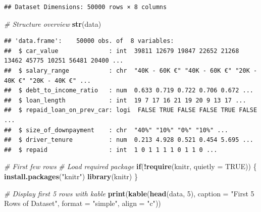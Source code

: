 \documentclass[
]{article}
\newenvironment{Shaded}{\begin{snugshade}}{\end{snugshade}}
\newcommand{\AttributeTok}[1]{\textcolor[rgb]{0.13,0.29,0.53}{#1}}
\newcommand{\CommentTok}[1]{\textcolor[rgb]{0.56,0.35,0.01}{\textit{#1}}}
\newcommand{\ConstantTok}[1]{\textcolor[rgb]{0.56,0.35,0.01}{#1}}
\newcommand{\ControlFlowTok}[1]{\textcolor[rgb]{0.13,0.29,0.53}{\textbf{#1}}}
\newcommand{\DecValTok}[1]{\textcolor[rgb]{0.00,0.00,0.81}{#1}}
\newcommand{\FunctionTok}[1]{\textcolor[rgb]{0.13,0.29,0.53}{\textbf{#1}}}
\newcommand{\NormalTok}[1]{#1}
\newcommand{\SpecialCharTok}[1]{\textcolor[rgb]{0.81,0.36,0.00}{\textbf{#1}}}
\newcommand{\StringTok}[1]{\textcolor[rgb]{0.31,0.60,0.02}{#1}}
\begin{document}
\begin{verbatim}
## Dataset Dimensions: 50000 rows × 8 columns
\end{verbatim}

\begin{Shaded}
\begin{Highlighting}[]
\CommentTok{\# Structure overview}
\FunctionTok{str}\NormalTok{(data)}
\end{Highlighting}
\end{Shaded}

\begin{verbatim}
## 'data.frame':    50000 obs. of  8 variables:
##  $ car_value              : int  39811 12679 19847 22652 21268 13462 45775 10251 56481 20400 ...
##  $ salary_range           : chr  "40K - 60K €" "40K - 60K €" "20K - 40K €" "20K - 40K €" ...
##  $ debt_to_income_ratio   : num  0.633 0.719 0.722 0.706 0.672 ...
##  $ loan_length            : int  19 7 17 16 21 19 20 9 13 17 ...
##  $ repaid_loan_on_prev_car: logi  FALSE TRUE FALSE FALSE TRUE FALSE ...
##  $ size_of_downpayment    : chr  "40%" "10%" "0%" "10%" ...
##  $ driver_tenure          : num  0.213 4.928 0.521 0.454 5.695 ...
##  $ repaid                 : int  1 0 1 1 1 1 0 1 1 0 ...
\end{verbatim}

\begin{Shaded}
\begin{Highlighting}[]
\CommentTok{\# First few rows}
\CommentTok{\# Load required package}
\ControlFlowTok{if}\NormalTok{(}\SpecialCharTok{!}\FunctionTok{require}\NormalTok{(knitr, }\AttributeTok{quietly =} \ConstantTok{TRUE}\NormalTok{)) \{}
  \FunctionTok{install.packages}\NormalTok{(}\StringTok{"knitr"}\NormalTok{)}
  \FunctionTok{library}\NormalTok{(knitr)}
\NormalTok{\}}

\CommentTok{\# Display first 5 rows with kable}
\FunctionTok{print}\NormalTok{(}\FunctionTok{kable}\NormalTok{(}\FunctionTok{head}\NormalTok{(data, }\DecValTok{5}\NormalTok{), }
            \AttributeTok{caption =} \StringTok{"First 5 Rows of Dataset"}\NormalTok{,}
            \AttributeTok{format =} \StringTok{"simple"}\NormalTok{,}
            \AttributeTok{align =} \StringTok{"c"}\NormalTok{))}
\end{Highlighting}
\end{Shaded}
\end{document}
